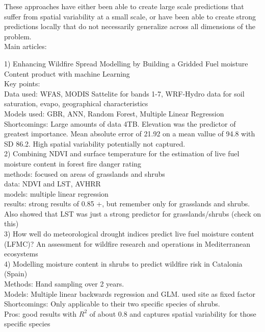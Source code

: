 \documentclass[twocolumn,10pt]{article}
\begin{document}
These approaches have either been able to create large scale predictions that suffer from spatial variability at a small scale, or have been able to create strong predictions locally that do not necessarily generalize across all dimensions of the problem. \\

Main articles:

1) Enhancing Wildfire Spread Modelling by Building a Gridded Fuel moisture Content product with machine Learning \\
Key points:\\
Data used: WFAS, MODIS Sattelite for bands 1-7, WRF-Hydro data for soil saturation, evapo, geographical characteristics \\
Models used: GBR, ANN, Random Forest, Multiple Linear Regression \\
Shortcomings: Large amounts of data 4TB. Elevation was the predictor of greatest importance. Mean absolute error of 21.92 on a mean vallue of 94.8 with SD 86.2. High spatial variability potentially not captured. \\

2) Combining NDVI and surface temperature for the estimation of live fuel moisture content in forest fire danger rating \\
methods: focused on areas of grasslands and shrubs \\
data: NDVI and LST, AVHRR\\
models: multiple linear regression \\
results: strong results of 0.85 +, but remember only for grasslands and shrubs. Also showed that LST was just a strong predictor for grasslands/shrubs (check on this) \\


3) How well do meteorological drought indices predict live fuel moisture content (LFMC)? An assessment for wildfire research and operations in Mediterranean ecosystems \\
4) Modelling moisture content in shrubs to predict wildfire risk in Catalonia (Spain) \\
Methods: Hand sampling over 2 years. \\
Models: Multiple linear backwards regression and GLM. used site as fixed factor \\
Shortcomings: Only applicable to their two specific species of shrubs. \\
Pros: good results with $R^2$ of about $0.8$ and captures spatial variability for those specific species \\
\end{document}
